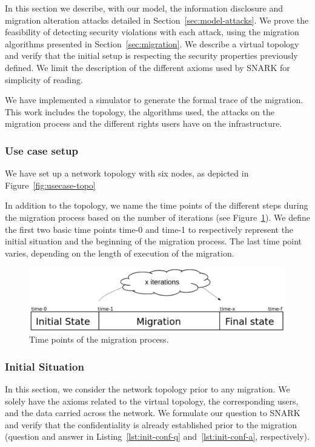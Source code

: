 \label{sec:model-usecase}
In this section we describe, with our model, the information disclosure and migration alteration attacks detailed in Section~\ref{sec:model-attacks}.
We prove the feasibility of detecting security violations with each attack, using the migration algorithms presented in Section~\ref{sec:migration}.
We describe a virtual topology and verify that the initial setup is respecting the security properties previously defined.
We limit the description of the different axioms used by SNARK for simplicity of reading.

We have implemented a simulator to generate the formal trace of the migration.
This work includes the topology, the algorithms used, the attacks on the migration process and the different rights users have on the infrastructure.

\subsubsection{Use case setup}
We have set up a network topology with six nodes, as depicted in Figure~\ref{fig:usecase-topo}




In addition to the topology, we name the time points of the different steps during the migration process based on the number of iterations (see Figure~\ref{fig:time-points}).
We define the first two basic time points time-0 and time-1 to respectively represent the initial situation and the beginning of the migration process. The last time point varies, depending on the length of execution of the migration.


\begin{figure}[htbp]
\centering
\includegraphics[scale=0.5]{figures/time-points-evolution} 
\caption{Time points of the migration process.\label{fig:time-points}}
\end{figure}

\subsubsection{Initial Situation}
In this section, we consider the network topology prior to any migration.
We solely have the axioms related to the virtual topology, the corresponding users, and the data carried across the network.
We formulate our question to SNARK and verify that the confidentiality is already established prior to the migration (question and answer in Listing~\ref{lst:init-conf-q} and~\ref{lst:init-conf-a}, respectively).



